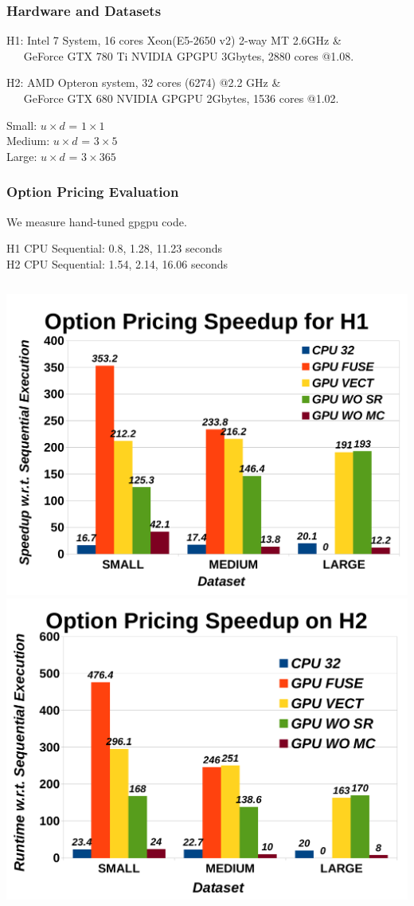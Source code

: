 \documentclass{beamer}
\newcommand{\emp}[1]{\textcolor{DikuRed}{ #1}}
\begin{document}
\begin{frame}[fragile,t]
    \frametitle{Hardware and Datasets}

H1: Intel 7 System, 16 cores  Xeon(E5-2650 v2) 2-way MT \@2.6GHz \&\\
$\mbox{ }~~~~$GeForce GTX 780 Ti NVIDIA GPGPU 3Gbytes, 2880 cores @1.08.\\\smallskip

H2: AMD Opteron system, 32 cores (6274) @2.2 GHz \&\\
$\mbox{ }~~~~$GeForce GTX 680 NVIDIA GPGPU 2Gbytes, 1536 cores @1.02.\\\bigskip

Small: $u\times d$ = $1\times 1$\\
Medium: $u\times d$ = $3\times 5$\\
Large: $u\times d$ = $3\times 365$

\end{frame}



\begin{frame}[fragile,t]
\frametitle{Option Pricing Evaluation}

\emp{We measure hand-tuned {\sc gpgpu} code.}

H1 CPU Sequential: 0.8,   1.28, 11.23 seconds\\
H2 CPU Sequential: 1.54,  2.14, 16.06 seconds

\smallskip

\begin{columns}
\includegraphics[height=27ex]{Figures/OptionPricing.pdf} 
\includegraphics[height=27ex]{Figures/OptionPriceResNapo.pdf} 
\end{columns}
\end{frame}
\end{document}
